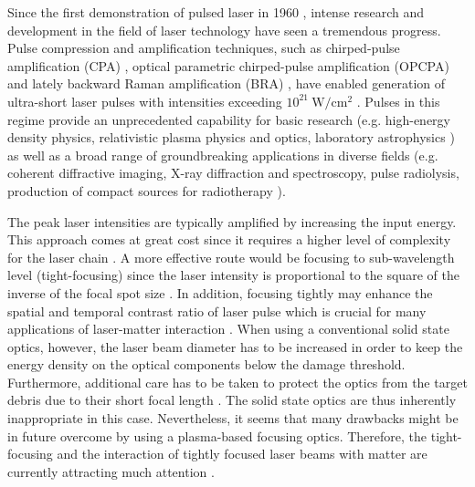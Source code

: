 Since the first demonstration of pulsed laser in 1960 \cite{Maiman1960}, intense research and development in the field of laser technology have seen a tremendous progress. Pulse compression and amplification techniques, such as chirped-pulse amplification (CPA) \cite{StricklandMourou1985}, optical parametric chirped-pulse amplification (OPCPA) \cite{Dubietis1992} and lately backward Raman amplification (BRA) \cite{Malkin1999}, have enabled generation of ultra-short laser pulses with intensities exceeding $ 10^{21} \ \mathrm{W/cm^{2}} $ \cite{Danson2015}. Pulses in this regime provide an unprecedented capability for basic research (e.g. high-energy density physics, relativistic plasma physics and optics, laboratory astrophysics \cite{Council2003, Graziani2014, Lebedev2007, Bridgman1958, Krehl2008, Andreev2006, Weber2013, Bulanov2015, Zakharov2003}) as well as a broad range of groundbreaking applications in diverse fields (e.g. coherent diffractive imaging, X-ray diffraction and spectroscopy, pulse radiolysis, production of compact sources for radiotherapy \cite{Zewail2010, Bulanov2004, Malka2004}).

The peak laser intensities are typically amplified by increasing the input energy. This approach comes at great cost since it requires a higher level of complexity for the laser chain \cite{Fuchs2014}. A more effective route would be focusing to sub-wavelength level (tight-focusing) since the laser intensity is proportional to the square of the inverse of the focal spot size \cite{Kon2010}. In addition, focusing tightly may enhance the spatial and temporal contrast ratio of laser pulse which is crucial for many applications of laser-matter interaction \cite{Fuchs2014}. When using a conventional solid state optics, however, the laser beam diameter has to be increased in order to keep the energy density on the optical components below the damage threshold. Furthermore, additional care has to be taken to protect the optics from the target debris due to their short focal length \cite{Liu2011}. The solid state optics are thus inherently inappropriate in this case. Nevertheless, it seems that many drawbacks might be in future overcome by using a plasma-based focusing optics. Therefore, the tight-focusing and the interaction of tightly focused laser beams with matter are currently attracting much attention \cite{Popov2008, Popov2009, Lifschitz2016, Yan2005}. 

